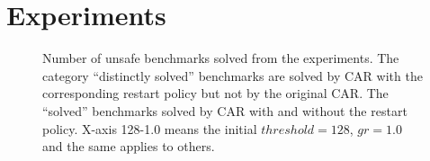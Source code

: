 \section{Experiments}
\begin{figure}[t]
\caption{Number of unsafe benchmarks solved from the experiments. The category ``distinctly solved'' benchmarks are solved by CAR with the corresponding restart policy but not by the original CAR. The ``solved'' benchmarks solved by CAR with and without the restart policy. X-axis 128-1.0 means the initial $threshold=128$, $gr=1.0$ and the same applies to others.}\label{fig:car}
\end{figure}
